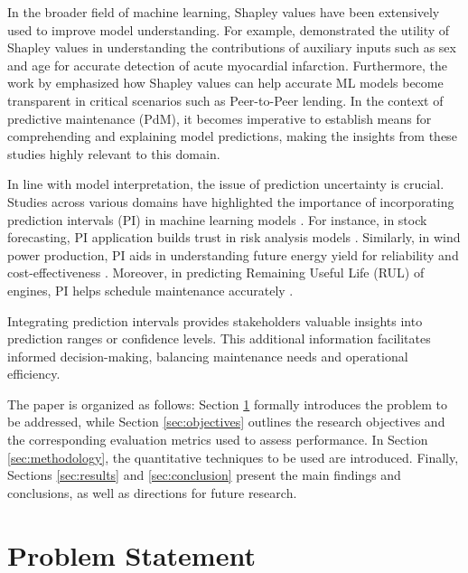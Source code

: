 \documentclass{IEEEtran}
\begin{document}
        In the broader field of machine learning, Shapley values have been extensively used to improve model understanding. For example, \cite{shap-health} demonstrated the utility of Shapley values in understanding the contributions of auxiliary inputs such as sex and age for accurate detection of acute myocardial infarction. Furthermore, the work by \cite{shap-credit-lending} emphasized how Shapley values can help accurate ML models become transparent in critical scenarios such as Peer-to-Peer lending. In the context of predictive maintenance (PdM), it becomes imperative to establish means for comprehending and explaining model predictions, making the insights from these studies highly relevant to this domain.

        In line with model interpretation, the issue of prediction uncertainty is crucial. Studies across various domains have highlighted the importance of incorporating prediction intervals (PI) in machine learning models \cite{pi-motivation}. For instance, in stock forecasting, PI application builds trust in risk analysis models \cite{pi-stock}. Similarly, in wind power production, PI aids in understanding future energy yield for reliability and cost-effectiveness \cite{pi-wind-power}. Moreover, in predicting Remaining Useful Life (RUL) of engines, PI helps schedule maintenance accurately \cite{pi-dl-rul}.

        Integrating prediction intervals provides stakeholders valuable insights into prediction ranges or confidence levels. This additional information facilitates informed decision-making, balancing maintenance needs and operational efficiency.

        The paper is organized as follows: Section \ref{sec:problem_statement} formally introduces the problem to be addressed, while Section \ref{sec:objectives} outlines the research objectives and the corresponding evaluation metrics used to assess performance. In Section \ref{sec:methodology}, the quantitative techniques to be used are introduced. Finally, Sections \ref{sec:results} and \ref{sec:conclusion} present the main findings and conclusions, as well as directions for future research.

    \section{Problem Statement} \label{sec:problem_statement}
\end{document}
